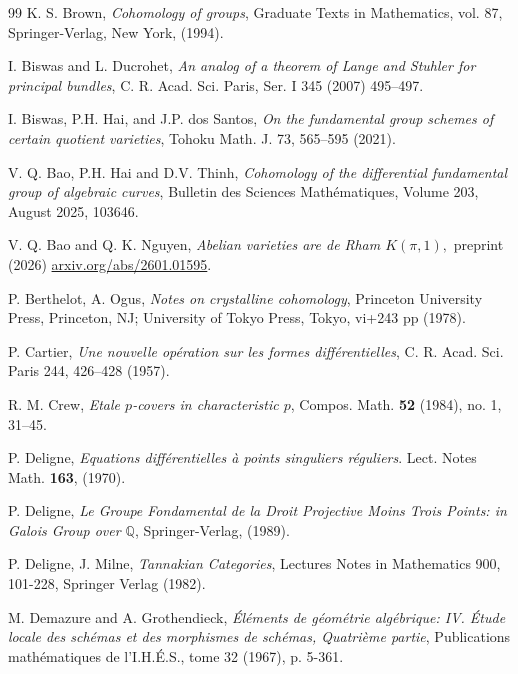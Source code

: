 \begin{thebibliography}{99}
 K. S. Brown, \textit{Cohomology of groups}, Graduate Texts in Mathematics, vol. 87, Springer-Verlag, New York, (1994).

 I. Biswas and L. Ducrohet,  \textit{An analog of a theorem of Lange and Stuhler for principal bundles}, C. R. Acad. Sci. Paris, Ser. I 345 (2007) 495--497.

 I. Biswas, P.H. Hai, and J.P. dos Santos,
\textit{On the fundamental group schemes of certain quotient varieties}, Tohoku Math. J.
73, 565--595  (2021).

 V. Q. Bao, P.H. Hai and D.V. Thinh, \textit{Cohomology of the differential fundamental group of algebraic curves},
Bulletin des Sciences Math\'ematiques, Volume 203, August 2025, 103646.

 V. Q. Bao and Q. K. Nguyen, \textit{Abelian varieties are de Rham $K(\pi,1),$} preprint (2026) \url{arxiv.org/abs/2601.01595}.

P. Berthelot, A. Ogus,  \textit{Notes on crystalline cohomology},
Princeton University Press, Princeton, NJ; University of Tokyo Press, Tokyo, vi+243 pp (1978).



 P. Cartier, \textit{Une nouvelle op\'eration sur les formes 
diff\'erentielles},
C. R. Acad. Sci. Paris 244, 426--428 (1957).

 R. M. Crew, \textit{Etale $p$-covers in characteristic
$p$}, Compos. Math. \textbf{52} (1984), no. 1, 31--45.


 P. Deligne, \textit{Equations diff\'erentielles \`a points singuliers 
r\'eguliers}. Lect. Notes Math. \textbf{163}, (1970).

 P. Deligne, \textit{Le Groupe Fondamental de la Droit Projective Moins Trois Points: in Galois Group over $\mathbb{Q}$}, Springer-Verlag, (1989).

   P. Deligne, J. Milne, \textit{ Tannakian Categories}, Lectures Notes in Mathematics 900, 101-228, Springer Verlag (1982). 

 M. Demazure and A. Grothendieck, 
\textit{\'El\'ements de g\'eom\'etrie alg\'ebrique: IV. \'Etude locale des sch\'emas et des
morphismes de sch\'emas, Quatri\`eme partie}, 
Publications math\'ematiques de l'I.H.\'E.S., 
tome 32 (1967), p. 5-361.


\end{thebibliography}

